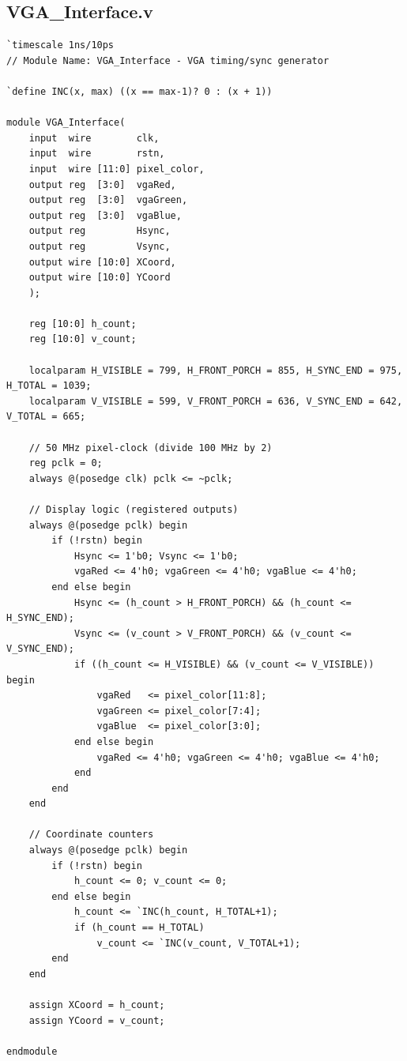 \documentclass[11pt,a4paper]{article}
\begin{document}
\subsection*{VGA\_Interface.v}
\begin{lstlisting}
`timescale 1ns/10ps
// Module Name: VGA_Interface - VGA timing/sync generator

`define INC(x, max) ((x == max-1)? 0 : (x + 1))

module VGA_Interface(
    input  wire        clk,
    input  wire        rstn,
    input  wire [11:0] pixel_color,
    output reg  [3:0]  vgaRed,
    output reg  [3:0]  vgaGreen,
    output reg  [3:0]  vgaBlue,
    output reg         Hsync,
    output reg         Vsync,
    output wire [10:0] XCoord,
    output wire [10:0] YCoord
    );

    reg [10:0] h_count;
    reg [10:0] v_count;

    localparam H_VISIBLE = 799, H_FRONT_PORCH = 855, H_SYNC_END = 975, H_TOTAL = 1039;
    localparam V_VISIBLE = 599, V_FRONT_PORCH = 636, V_SYNC_END = 642, V_TOTAL = 665;

    // 50 MHz pixel-clock (divide 100 MHz by 2)
    reg pclk = 0;
    always @(posedge clk) pclk <= ~pclk;

    // Display logic (registered outputs)
    always @(posedge pclk) begin
        if (!rstn) begin
            Hsync <= 1'b0; Vsync <= 1'b0;
            vgaRed <= 4'h0; vgaGreen <= 4'h0; vgaBlue <= 4'h0;
        end else begin
            Hsync <= (h_count > H_FRONT_PORCH) && (h_count <= H_SYNC_END);
            Vsync <= (v_count > V_FRONT_PORCH) && (v_count <= V_SYNC_END);
            if ((h_count <= H_VISIBLE) && (v_count <= V_VISIBLE)) begin
                vgaRed   <= pixel_color[11:8];
                vgaGreen <= pixel_color[7:4];
                vgaBlue  <= pixel_color[3:0];
            end else begin
                vgaRed <= 4'h0; vgaGreen <= 4'h0; vgaBlue <= 4'h0;
            end
        end
    end

    // Coordinate counters
    always @(posedge pclk) begin
        if (!rstn) begin
            h_count <= 0; v_count <= 0;
        end else begin
            h_count <= `INC(h_count, H_TOTAL+1);
            if (h_count == H_TOTAL)
                v_count <= `INC(v_count, V_TOTAL+1);
        end
    end

    assign XCoord = h_count;
    assign YCoord = v_count;

endmodule
\end{lstlisting}
\end{document}
